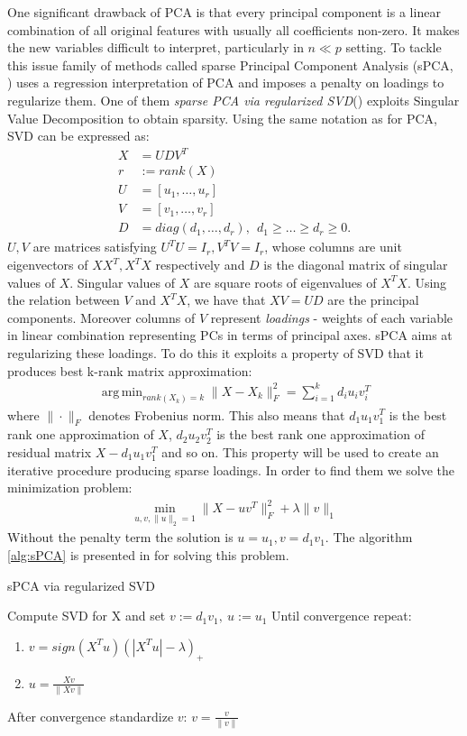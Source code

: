 \documentclass[shortabstract, english, mgr]{iithesis}
\DeclareMathOperator*{\argmin}{arg\,min}
\begin{document}
One significant drawback of PCA is that every principal component is a linear combination of all original features with usually all coefficients non-zero. It makes the new variables difficult to interpret, particularly in $n \ll p $ setting. To tackle this issue family of methods called sparse Principal Component Analysis (sPCA, \cite{sPCAold}) uses a regression interpretation of PCA and imposes a penalty on loadings to regularize them. One of them \textit{sparse PCA via regularized SVD}(\cite{SPCAnew}) exploits Singular Value Decomposition to obtain sparsity. Using the same notation as for PCA, SVD can be expressed as:
\begin{align*}
    X &= UDV^T \\
    r &:= rank(X) \\
    U &= [u_1, \ldots, u_r] \\
    V &= [v_1, \ldots, v_r] \\
    D &= diag(d_1, \ldots, d_r), \ \ d_1 \geq \ldots \geq d_r \geq 0. 
\end{align*}
$U, V$ are matrices satisfying $U^TU = I_r, V^TV = I_r$, whose columns are unit eigenvectors of $XX^T, X^TX$ respectively and $D$ is the diagonal matrix of singular values of $X$. Singular values of $X$ are square roots of eigenvalues of $X^TX$. Using the relation between $V$ and $X^TX$, we have that $XV = UD$ are the principal components. Moreover columns of $V$ represent \textit{loadings} - weights of each variable in linear combination representing PCs in terms of principal axes. sPCA aims at regularizing these loadings. To do this it exploits a property of SVD that it produces best k-rank matrix approximation:
\begin{align*}
    \argmin_{rank(X_k) = k}\| X - X_k \|_F^2 = \sum_{i=1}^k d_iu_iv_i^T
\end{align*} where $\| \cdot \|_F$ denotes Frobenius norm. This also means that $d_1u_1v_1^T$ is the best rank one approximation of $X$, $d_2u_2v_2^T$ is the best rank one approximation of residual matrix $X - d_1u_1v_1^T$ and so on. This property will be used to create an iterative procedure producing sparse loadings. In order to find them we solve the minimization problem:
\begin{align*}
    \min_{u,v, \|u\|_2=1}\|X - uv^T\|_F^2 + \lambda \| v \|_1
\end{align*}
Without the penalty term the solution is $u = u_1, v=d_1v_1$. The algorithm \ref{alg:sPCA} is presented in \cite{SPCAnew} for solving this problem.
\begin{algorithm}[H]
\caption{sPCA via regularized SVD}
\label{alg:sPCA}          
\begin{algorithmic}                    
    \STATE Compute SVD for X and set $v := d_1v_1, \ u := u_1$
    \STATE Until convergence repeat:
    \begin{enumerate}
        \item $v = sign(X^Tu)(|X^Tu| - \lambda)_+$
        \item $u = \frac{Xv}{\|Xv\|}$
    \end{enumerate}
    \STATE After convergence standardize $v$: $v = \frac{v}{\|v\|}$
\end{algorithmic}
\end{algorithm}
\end{document}
